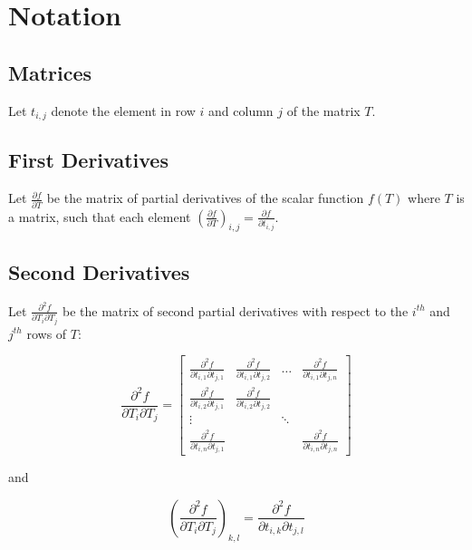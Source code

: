 \documentclass{report}
\begin{document}
\chapter{Notation}

\section{Matrices}

Let $t_{i,j}$ denote the element in row $i$ and column $j$ of the matrix $T$.

\section{First Derivatives}

Let $\frac{\partial f}{\partial T}$ be the matrix of partial derivatives of the scalar function $f(T)$ where $T$ is a matrix, such that each element $(\frac{\partial f}{\partial T})_{i,j} = \frac{\partial f}{\partial t_{i,j}}$.

\section{Second Derivatives}

Let $\frac{\partial^2 f}{\partial T_i \partial T_j}$ be the matrix of second partial derivatives with respect to the $i^{th}$ and $j^{th}$ rows of $T$:

\begin{equation}
\frac{\partial^2 f}{\partial T_i \partial T_j} = 
\left[ \begin{array}{cccc}
\frac{\partial^2 f}{\partial t_{i,1} \partial t_{j,1}} &
\frac{\partial^2 f}{\partial t_{i,1} \partial t_{j,2}} &
\ldots &
\frac{\partial^2 f}{\partial t_{i,1} \partial t_{j,n}} \\
\frac{\partial^2 f}{\partial t_{i,2} \partial t_{j,1}} &
\frac{\partial^2 f}{\partial t_{i,2} \partial t_{j,2}} \\
\vdots & & \ddots \\
\frac{\partial^2 f}{\partial t_{i,n} \partial t_{j,1}} & & &
\frac{\partial^2 f}{\partial t_{i,n} \partial t_{j,n}}
\end{array} \right]
\end{equation}

and

\begin{equation}
\label{dsecelem}
\left(\frac{\partial^2 f}{\partial T_i \partial T_j}\right)_{k,l} = 
\frac{\partial^2 f}{\partial t_{i,k} \partial t_{j,l}}
\end{equation}
\end{document}
